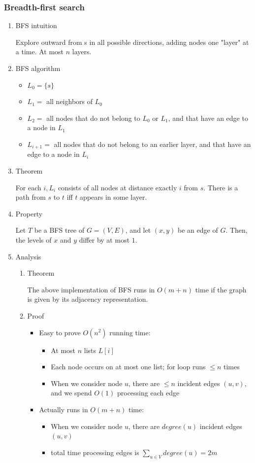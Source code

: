 \documentclass[11pt]{article}
\begin{document}
\subsubsection{Breadth-first search}
\label{sec:orgcfcaa7f}
\begin{enumerate}
\item BFS intuition
\label{sec:org27563d8}

Explore outward from s in all possible directions, adding nodes one "layer" at a time. At most \(n\) layers.
\item BFS algorithm
\label{sec:orgd36ebc0}
\begin{itemize}
\item \(L_0=\{s\}\)
\item \(L_1 =\) all neighbors of \(L_0\)
\item \(L_2 =\) all nodes that do not belong to \(L_0\) or \(L_1\), and that have an edge to a node in \(L_1\)
\item \(L_{i+1}=\) all nodes that do not belong to an earlier layer, and that have an edge to a node in \(L_i\)
\end{itemize}
\item Theorem
\label{sec:orgd9d50dd}

For each \(i, L_i\) consists of all nodes at distance exactly \(i\) from \(s\). There is a path from \(s\) to \(t\) iff \(t\) appears in some layer.
\item Property
\label{sec:org3cd83ab}

Let \(T\) be a BFS tree of \(G=(V,E)\), and let \((x,y)\) be an edge of \(G\). Then, the levels of \(x\) and \(y\) differ by at most \(1\).

\item Analysis
\label{sec:org52b1722}
\begin{enumerate}
\item Theorem
\label{sec:org660c813}

The above implementation of BFS runs in \(O(m+n)\) time if the graph is given by its adjacency representation.
\item Proof
\label{sec:org733faba}
\begin{itemize}
\item Easy to prove \(O(n^2)\) running time:
\begin{itemize}
\item At most \(n\) lists \(L[i]\)
\item Each node occurs on at most one list; for loop runs \(\leq n\) times
\item When we consider node \(u\), there are \(\leq n\) incident edges \((u,v)\), and we spend \(O(1)\) processing each edge
\end{itemize}
\item Actually runs in \(O(m+n)\) time:
\begin{itemize}
\item When we consider node \(u\), there are \(degree(u)\) incident edges \((u,v)\)
\item total time processing edges is \(\sum_{u\in V} degree(u)=2m\)
\end{itemize}
\end{itemize}
\end{enumerate}
\end{enumerate}
\end{document}
